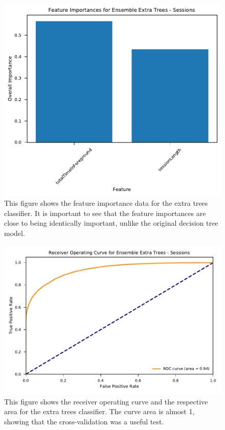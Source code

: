 \documentclass{l4proj}
\begin{document}
\begin{appendices}
\begin{figure}[htb]
    \centering
    \includegraphics[width=\linewidth]{images/sessions/feature_importance_EnsembleExtraTreesSessions.pdf}
    \caption{This figure shows the feature importance data for the extra trees classifier. It is important to see that the feature importances are close to being identically important, unlike the original decision tree model.}
    \label{fig:session_extra_trees_feature} 
\end{figure}

\begin{figure}[htb]
    \centering
    \includegraphics[width=\linewidth]{images/sessions/roc_EnsembleExtraTreesSessions.pdf}
    \caption{This figure shows the receiver operating curve and the respective area for the extra trees classifier. The curve area is almost 1, showing that the cross-validation was a useful test.}
    \label{fig:session_extra_trees_roc} 
\end{figure}


\end{appendices}
\end{document}
